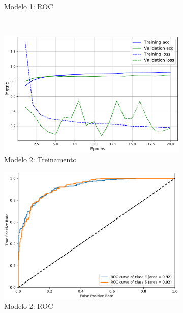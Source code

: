 \begin{figure}[!t]
\begin{subfigure}{.5\textwidth}
    \caption{Modelo 1: ROC}
    \label{fig:mod1_roc}
  \end{subfigure}\\[3mm]
  \begin{subfigure}{.5\textwidth}
    \includegraphics[width=.98\linewidth,left]{figures/sdss_pretrained_train.pdf}
    \caption{Modelo 2: Treinamento}
    \label{fig:mod2_treinamento}
  \end{subfigure}%
  \begin{subfigure}{.5\textwidth}
    \includegraphics[width=.98\linewidth,right]{figures/roc_sdss_pretrained.pdf}
    \caption{Modelo 2: ROC}
    \label{fig:mod2_roc}
  \end{subfigure}\\[3mm]
  \begin{subfigure}{.5\textwidth}

\end{subfigure}
\end{figure}
